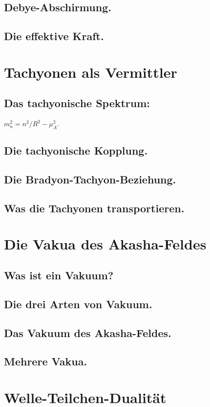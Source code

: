 \documentclass[11pt,a4paper]{article}
\begin{document}
\subsection{Debye-Abschirmung.}
\subsection{Die effektive Kraft.}

\section{Tachyonen als Vermittler}
\subsection{Das tachyonische Spektrum:} $m_n^2 = n^2/R^2 - \mu_A^2$.
\subsection{Die tachyonische Kopplung.}
\subsection{Die Bradyon-Tachyon-Beziehung.}
\subsection{Was die Tachyonen transportieren.}

\section{Die Vakua des Akasha-Feldes}
\subsection{Was ist ein Vakuum?}
\subsection{Die drei Arten von Vakuum.}
\subsection{Das Vakuum des Akasha-Feldes.}
\subsection{Mehrere Vakua.}

\section{Welle-Teilchen-Dualität}
\end{document}

